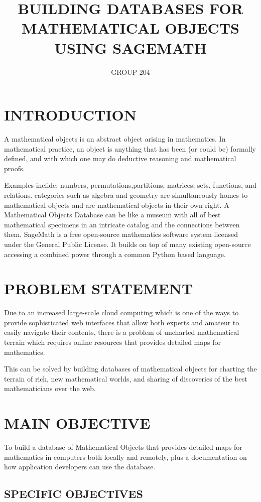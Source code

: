 \documentclass[11pt]{article} %
\title{BUILDING DATABASES FOR MATHEMATICAL OBJECTS USING SAGEMATH}
\author{GROUP 204}
\begin{document}
\maketitle

\section{INTRODUCTION}
A mathematical objects is an abstract object arising in mathematics.
In mathematical practice, an object is anything that has been (or could be) formally defined, and with which one may do deductive reasoning and mathematical proofs.

Examples inclide: numbers, permutations,partitions, matrices, sets, functions, and relations.
categories such as algebra and geometry are simultaneously homes to mathematical objects and are mathematical objects in their own right.
A Mathematical Objects Database can be like a museum with all of best
mathematical specimens in an intricate catalog and the connections
between them.
SageMath is a free open-source mathematics software
system licensed under the General Public License. It builds on top of
many existing open-source accessing a combined power through a common
Python based language.


\section{PROBLEM STATEMENT}

Due to an increased large-scale cloud computing which is one of the ways to provide sophisticated web interfaces that allow both experts and amateur to easily navigate their contents, there is a problem of uncharted mathematical terrain which requires online resources that provides detailed maps for mathematics.

 This can be solved by building databases of mathematical objects for charting the terrain of rich, new mathematical worlds, and sharing of discoveries of the best mathematicians over the web.


\section{MAIN OBJECTIVE}

To build a database of Mathematical Objects that provides detailed maps for mathematics in computers both locally and remotely, plus a documentation on how application developers can use the database.

\subsection{SPECIFIC OBJECTIVES}
\end{document}
